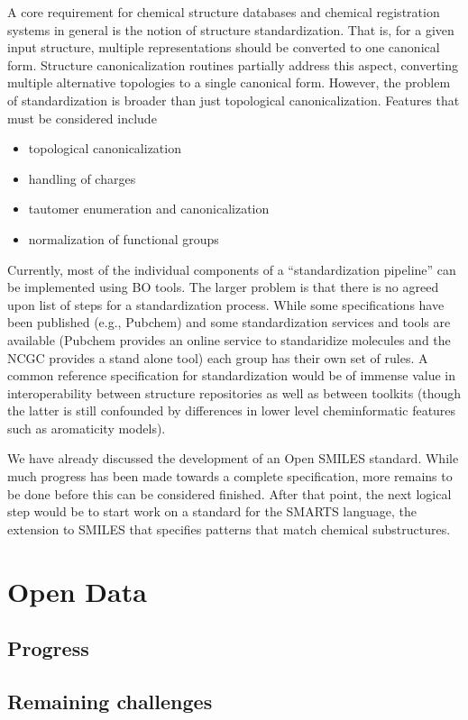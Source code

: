 \documentclass[10pt]{bmc_article}
\newenvironment{bmcformat}{\begin{raggedright}\baselineskip20pt\sloppy\setboolean{publ}{false}}{\end{raggedright}\baselineskip20pt\sloppy}
\begin{document}
\begin{bmcformat}
A core requirement for chemical structure databases and chemical
registration systems in general is the notion of structure
standardization.  That is,  for a given input structure, multiple
representations should be converted to one canonical form. 
Structure canonicalization routines partially address this aspect,
converting multiple alternative topologies to a single canonical
form. However, the problem of standardization is broader than just
topological canonicalization. Features that must be considered include
\begin{itemize}
\item topological canonicalization
\item handling of charges
\item tautomer enumeration and canonicalization
\item normalization of functional groups
\end{itemize}
Currently, most of the individual components of a ``standardization
pipeline'' can be implemented using BO tools. The larger problem is
that there is no agreed upon list of steps for a standardization
process. While some specifications have been published (e.g., Pubchem)
and some standardization services and tools are available (Pubchem
provides an online service to standaridize molecules and the NCGC
provides a stand alone tool) each group has their own set of rules. A
common reference specification for standardization would be of immense
value in interoperability between structure repositories as well as
between toolkits (though the latter is still confounded by differences
in lower level cheminformatic features such as aromaticity models).

We have already discussed the development of an Open SMILES standard. While much progress has been made towards a complete specification, more remains to be done before this can be considered finished. After that point, the next logical step would be to start work on a standard for the SMARTS language, the extension to SMILES that specifies patterns that match chemical substructures.

\section*{Open Data}
  \subsection*{Progress}
  \subsection*{Remaining challenges}


\end{bmcformat}
\end{document}
